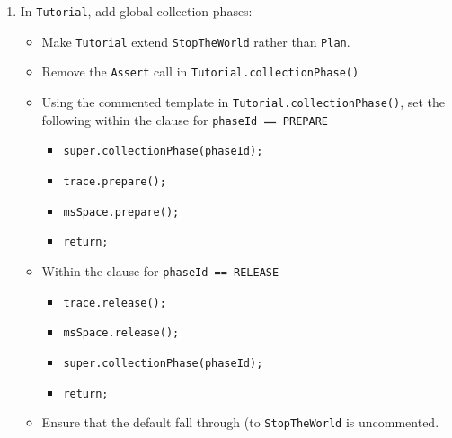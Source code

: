 \documentclass{article}
\newcommand{\code}[1]{\texttt{#1}}
\begin{document}
\begin{itemize}
\begin{enumerate}
\begin{enumerate}
        \item In \code{Tutorial}, add global collection phases:
        \begin{itemize}
            \item Make \code{Tutorial} extend \code{StopTheWorld} rather than \code{Plan}.
            \item Remove the \code{Assert} call in \code{Tutorial.collectionPhase()}
            \item Using the commented template in
            \code{Tutorial.collectionPhase()}, set the following
            within the clause for
            \code{phaseId == PREPARE}
            \begin{itemize}
                \item[] \code{super.collectionPhase(phaseId);}
                \item[] \code{trace.prepare();}
                \item[] \code{msSpace.prepare();}
                \item[] \code{return;}
            \end{itemize}
            \item Within the clause for \code{phaseId == RELEASE}
            \begin{itemize}
                \item[] \code{trace.release();}
                \item[] \code{msSpace.release();}
                \item[] \code{super.collectionPhase(phaseId);}
                \item[] \code{return;}
            \end{itemize}
            \item Ensure that the default fall through (to
            \code{StopTheWorld} is uncommented.
        \end{itemize}


\end{enumerate}
\end{enumerate}
\end{itemize}
\end{document}
